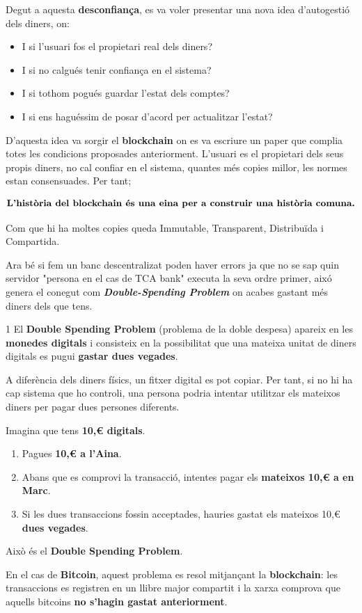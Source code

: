 \documentclass[12pt]{article}
\begin{document}
Degut a aquesta \textbf{desconfiança}, es va voler presentar una nova idea d'autogestió dels diners, on:

\begin{itemize}
    \item I si l’usuari fos el propietari real dels diners?
    \item I si no calgués tenir confiança en el sistema?
    \item I si tothom pogués guardar l’estat dels comptes?
    \item I si ens haguéssim de posar d’acord per actualitzar l’estat?
\end{itemize}

D'aquesta idea va sorgir el \textbf{blockchain} on es va escriure un paper que complia totes les condicions proposades anteriorment. L'usuari es el propietari dels seus propis diners, no cal confiar en el sistema, quantes més copies millor, les normes estan consensuades. Per tant;

\[\text{\textbf{L'història del blockchain és una eina per a construir una història comuna.}}\]

Com que hi ha moltes copies queda Immutable, Transparent, Distribuïda i Compartida.

Ara bé si fem un banc descentralizat poden haver errors ja que no se sap quin servidor "persona en el cas de TCA bank" executa la seva ordre primer, aixó genera el conegut com \textbf{\textit{Double-Spending Problem}} on acabes gastant més diners dels que tens.

\begin{examplebox}{1}
    El \textbf{Double Spending Problem} (problema de la doble despesa) apareix en les \textbf{monedes digitals} i consisteix en la possibilitat que una mateixa unitat de diners digitals es pugui \textbf{gastar dues vegades}.

A diferència dels diners físics, un fitxer digital es pot copiar. Per tant, si no hi ha cap sistema que ho controli, una persona podria intentar utilitzar els mateixos diners per pagar dues persones diferents.

Imagina que tens \textbf{10,€ digitals}.

\begin{enumerate}
\item Pagues \textbf{10,€ a l'Aina}.
\item Abans que es comprovi la transacció, intentes pagar els \textbf{mateixos 10,€ a en Marc}.
\item Si les dues transaccions fossin acceptades, hauries gastat els mateixos 10,€ \textbf{dues vegades}.
\end{enumerate}

Això és el \textbf{Double Spending Problem}.

En el cas de \textbf{Bitcoin}, aquest problema es resol mitjançant la \textbf{blockchain}: les transaccions es registren en un llibre major compartit i la xarxa comprova que aquells bitcoins \textbf{no s'hagin gastat anteriorment}.
\end{examplebox}
\end{document}
